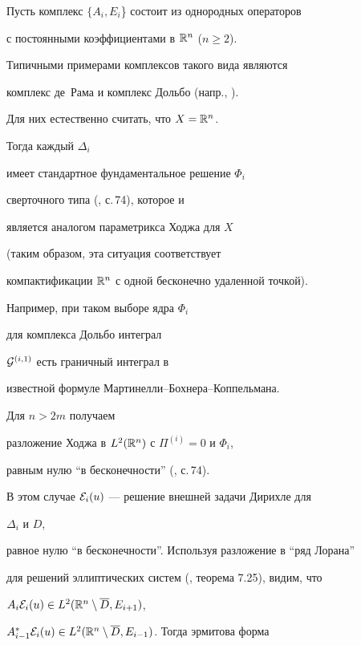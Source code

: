 \begin{examnonum}




Пусть комплекс $\{A_i , E_i$\} состоит из однородных операторов


с постоянными коэффициентами в ${\Bbb R}^n$ ($n\geq 2$).


Типичными примерами комплексов такого вида являются


комплекс де~Рама и комплекс Дольбо (напр., \cite{Ta2}).


Для них естественно считать, что $X={\Bbb R}^n$.





Тогда каждый $\Delta_i$


имеет стандартное фундаментальное решение $\Phi_i$


сверточного типа (\cite{T4}, с.\,74), которое и


является аналогом параметрикса Ходжа для $X$


(таким образом, эта ситуация соответствует


компактификации ${\Bbb R}^n$ с одной бесконечно удаленной точкой).


Например, при таком выборе ядра $\Phi_i$


для комплекса Дольбо интеграл


${\cal G}^{(i,1)}$ есть граничный интеграл в


известной формуле Мартинелли--Бохнера--Коппельмана.





Для $n> 2m$ получаем


разложение Ходжа в $L^2({\Bbb R}^n)$ с $\Pi^{(i)}=0$ и $\Phi_ i$,


равным нулю ``в бесконечности'' (\cite{T4}, с.\,74).


В этом случае ${\cal E}_i (u)$ --- решение внешней задачи Дирихле для


$\Delta_i $ и $D$,


равное нулю ``в бесконечности''. Используя разложение в ``ряд Лорана''


для решений эллиптических систем (\cite{T4}, теорема 7.25), видим, что


$A_i {\cal E}_i (u) \in L^2 ({\Bbb R}^n \setminus \overline D, E_{i+1})$,


$A_{i-1}^* {\cal E}_i (u) \in L^2 ({\Bbb R}^n \setminus \overline D,


E_{i-1})$. Тогда эрмитова форма



\end{examnonum}
